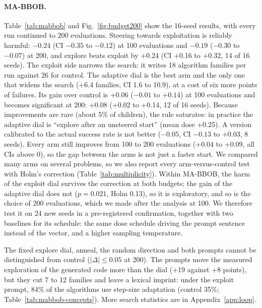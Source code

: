 \paragraph{MA-BBOB\@.}
Table~\ref{tab:mabbob} and Fig.~\ref{fig:budget200} show the 16-seed
results, with every run continued to 200 evaluations. Steering towards
exploitation is reliably harmful: $-0.24$ \aocc (CI $-0.35$ to $-0.12$)
at 100 evaluations and $-0.19$ ($-0.30$ to $-0.07$) at 200, and explore
beats exploit by +0.24 (CI +0.16 to +0.32, 14 of 16 seeds). The
exploit side narrows the search: it writes 18 algorithm families per run
against 26 for control. The adaptive dial is the best arm and the only
one that widens the search (+6.4 families, CI 1.6 to 10.9), at a cost
of six more points of failures. Its gain over control is +0.06 ($-0.01$
to $+0.14$) at 100 evaluations and becomes significant at 200: +0.08
(+0.02 to +0.14, 12 of 16 seeds). Because improvements are rare (about
5\% of children), the rule saturates: in practice the adaptive dial is
``explore after an unsteered start'' (mean dose +0.25). A version
calibrated to the actual success rate is not better ($-0.05$, CI $-0.13$
to $+0.03$, 8 seeds). Every arm still improves from 100 to 200
evaluations (+0.04 to +0.09, all CIs above 0), so the gap between the
arms is not just a faster start. We compared many arms on several
problems, so we also report every arm-versus-control test with Holm's
correction (Table~\ref{tab:multiplicity}). Within MA-BBOB, the harm of
the exploit dial survives the correction at both budgets; the gain of
the adaptive dial does not ($p=0.021$, Holm 0.13), so it is
exploratory, and so is the choice of 200 evaluations, which we made
after the analysis at 100. We therefore test it on 24 new seeds in a
pre-registered confirmation, together with two baselines for its
schedule: the same dose schedule driving the prompt sentence instead of
the vector, and a higher sampling temperature.

The fixed explore dial, anneal, the random direction and both prompts
cannot be distinguished from control ($|\Delta|\le0.05$ at 200). The
prompts move the measured exploration of the generated code more than
the dial (+19 against +8 points), but they cut 7 to 12 families and
leave a lexical imprint: under the exploit prompt, 84\% of the
algorithms use step-size adaptation (control 35\%;
Table~\ref{tab:mabbob-concepts}). More search statistics are in
Appendix~\ref{app:loop}.

